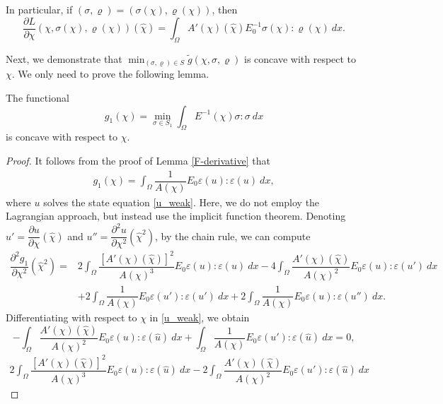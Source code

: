 \documentclass{amsart}
\begin{document}
In particular, if $(\sigma,\varrho)=(\sigma(\chi),\varrho(\chi))$, then
\begin{equation}\label{obj_derivative}
    \dfrac{\partial L}{\partial \chi}(\chi,\sigma(\chi),\varrho(\chi))(\hat{\chi}) =\int_{\Omega}A'(\chi)(\hat{\chi}){E}_0^{-1}\sigma(\chi):\varrho(\chi)\ dx.
\end{equation}
    
Next, we demonstrate that $ \min_{(\sigma,\varrho)\in S}\tilde{g}(\chi,\sigma,\varrho) $ is concave with respect to $ \chi $. We only need to prove the following lemma.
\begin{lemma}\label{F-second-derivative}
    The functional 
    $$g_1(\chi)=\min_{\sigma\in S_1}\int_{\Omega}E^{-1}(\chi)\sigma:\sigma\ dx$$ 
    is concave with respect to $ \chi $.
\end{lemma}
\begin{proof}
     It follows from the proof of Lemma \ref{F-derivative} that 
    \begin{align*}
g_1(\chi)=\int_{\Omega}\dfrac{1}{A(\chi)}{E}_0\varepsilon(u):\varepsilon(u)\ dx,
    \end{align*}
    where $u$ solves the state equation \eqref{u_weak}. Here, we do not employ the Lagrangian approach, but instead use the implicit function theorem. Denoting \( u' = \dfrac{\partial u}{\partial\chi}(\hat{\chi}) \) and \( u'' = \dfrac{\partial^2 u}{\partial\chi^2}(\hat{\chi}^2) \), by the chain rule, we can compute
    \begin{align*}
        \dfrac{\partial^2 g_1}{\partial\chi^{2}}(\hat{\chi}^2)=& 2\int_{\Omega}\dfrac{[A'(\chi)(\hat{\chi})]^2}{A(\chi)^{3}}{E}_0\varepsilon(u):\varepsilon(u)\ dx-4\int_{\Omega}\dfrac{A'(\chi)(\hat{\chi})}{A(\chi)^2}{E}_0\varepsilon(u):\varepsilon(u')\ dx\\
        &+2\int_{\Omega}\dfrac{1}{A(\chi)}{E}_0\varepsilon(u'):\varepsilon(u')\ dx+2\int_{\Omega}\dfrac{1}{A(\chi)}{E}_0\varepsilon(u):\varepsilon(u'')\ dx.
    \end{align*}
    Differentiating with respect to $\chi$ in \eqref{u_weak}, we obtain 
    \begin{equation}
        -\int_{\Omega}\dfrac{A'(\chi)(\hat{\chi})}{A(\chi)^{2}}{E}_0\varepsilon(u):\varepsilon(\hat{u})\ dx+\int_{\Omega}\dfrac{1}{A(\chi)}{E}_0\varepsilon(u'):\varepsilon(\hat{u})\ dx=0,\nonumber
    \end{equation}
    \begin{align*}
        2\int_{\Omega}\dfrac{[A'(\chi)(\hat{\chi})]^2}{A(\chi)^{3}}{E}_0\varepsilon(u):\varepsilon(\hat{u})\ dx-2\int_{\Omega}\dfrac{A'(\chi)(\hat{\chi})}{A(\chi)^2}{E}_0\varepsilon(u'):\varepsilon(\hat{u})\ dx

\end{align*}
\end{proof}
\end{document}
